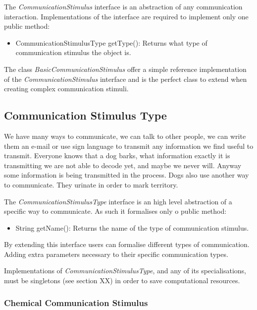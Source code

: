 The \emph{CommunicationStimulus} interface is an abstraction of any communication interaction. Implementations of the interface are required to implement only one public method:

\begin{itemize}
  \item CommunicationStimulusType getType(): Returns what type of communication stimulus the object is.
\end{itemize}

The class \emph{BasicCommunicationStimulus} offer a simple reference implementation of the \emph{CommunicationStimulus} interface and is the perfect class to extend when creating complex communication stimuli.

\subsection{Communication Stimulus Type}

We have many ways to communicate, we can talk to other people, we can write them an e-mail or use sign language to transmit any information we find useful to transmit. Everyone knows that a dog barks, what information exactly it is transmitting we are not able to decode yet, and maybe we never will. Anyway some information is being transmitted in the process. Dogs also use another way to communicate. They urinate in order to mark territory.

The \emph{CommunicationStimulusType} interface is an high level abstraction of a specific way to communicate. As such it formalises only o public method:

\begin{itemize}
  \item String getName(): Returns the name of the type of communication stimulus.
\end{itemize}

By extending this interface users can formalise different types of communication. Adding extra parameters necessary to their specific communication types.

Implementations of \emph{CommunicationStimulusType}, and any of its specialisations, must be singletons (see section XX) in order to save computational resources.

\subsubsection{Chemical Communication Stimulus}
\label{subsec:chemical-stimulus}

